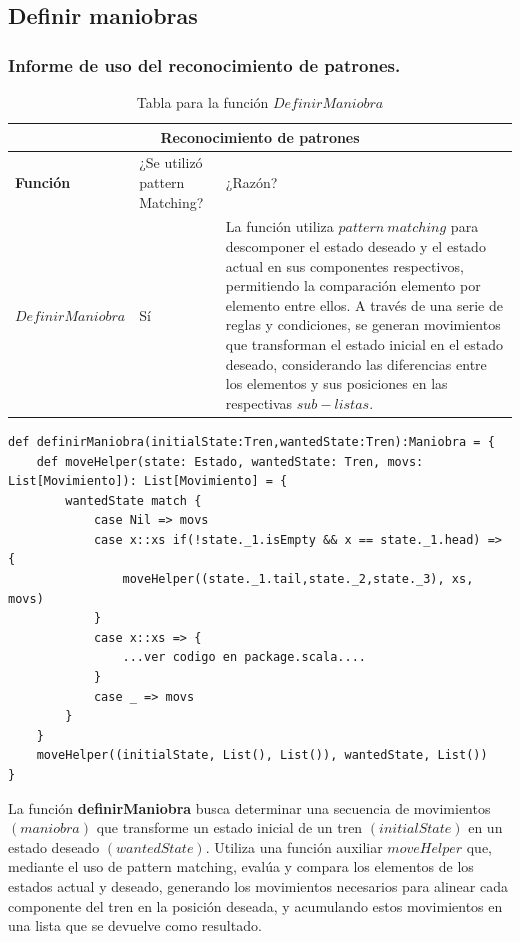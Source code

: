 \documentclass[12pt, a4paper]{article}
\begin{document}
\subsection{Definir maniobras}
\subsubsection{Informe de uso del reconocimiento de patrones.}
\begin{table}[H]
  \scriptsize
 \begin{tabular}{ |p{4cm}|p{3cm}|p{5.5cm}|  }
  \hline
  \multicolumn{3}{|c|}{Reconocimiento de patrones} \\
  \hline
  \textbf{Función}& ¿Se utilizó pattern Matching?  & ¿Razón?\\
  \hline 
  $ DefinirManiobra$  & Sí &  La función utiliza $pattern~matching$ para descomponer el estado deseado y el estado actual en sus componentes respectivos, permitiendo la comparación elemento por elemento entre ellos. A través de una serie de reglas y condiciones, se generan movimientos que transforman el estado inicial en el estado deseado, considerando las diferencias entre los elementos y sus posiciones en las respectivas $sub-listas$.\\
  \hline
 \end{tabular}
 \centering
 \caption{Tabla para la función $DefinirManiobra$}
 \end{table}
 \begin{lstlisting}[caption=Código en Scala para la funcion aplicarMovimientos, label=lst:scala_code]
  def definirManiobra(initialState:Tren,wantedState:Tren):Maniobra = {
    def moveHelper(state: Estado, wantedState: Tren, movs: List[Movimiento]): List[Movimiento] = {
        wantedState match {
            case Nil => movs
            case x::xs if(!state._1.isEmpty && x == state._1.head) => {
                moveHelper((state._1.tail,state._2,state._3), xs, movs)
            }
            case x::xs => {
                ...ver codigo en package.scala....                    
            }
            case _ => movs
        }
    }
    moveHelper((initialState, List(), List()), wantedState, List())
}
  \end{lstlisting}
  La función \textbf{definirManiobra} busca determinar una secuencia de movimientos $(maniobra)$ que transforme un estado inicial de un tren $(initialState)$ en un estado deseado $(wantedState)$. Utiliza una función auxiliar $moveHelper$ que, mediante el uso de pattern matching, evalúa y compara los elementos de los estados actual y deseado, generando los movimientos necesarios para alinear cada componente del tren en la posición deseada, y acumulando estos movimientos en una lista que se devuelve como resultado.
\end{document}
